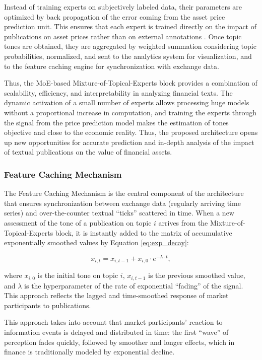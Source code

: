 Instead of training experts on subjectively labeled data, their parameters are optimized by back propagation of the error
coming from the asset price prediction unit. This ensures that each expert is trained directly on the impact of publications
on asset prices rather than on external annotations \parencite{shazeer2017outrageously}. Once topic tones are obtained,
they are aggregated by weighted summation considering topic probabilities, normalized, and sent to the analytics system
for visualization, and to the feature caching engine for synchronization with exchange data.

Thus, the MoE-based Mixture-of-Topical-Experts block provides a combination of scalability, efficiency, and interpretability
in analyzing financial texts. The dynamic activation of a small number of experts allows processing huge models without
a proportional increase in computation, and training the experts through the signal from the price prediction model makes
the estimation of tones objective and close to the economic reality. Thus, the proposed architecture opens up new opportunities
for accurate prediction and in-depth analysis of the impact of textual publications on the value of financial assets.

\subsubsection{Feature Caching Mechanism}
The Feature Caching Mechanism is the central component of the architecture that ensures synchronization
between exchange data (regularly arriving time series) and over-the-counter textual “ticks” scattered
in time. When a new assessment of the tone of a publication on topic $i$ arrives from the Mixture-of-Topical-Experts
block, it is instantly added to the matrix of accumulative exponentially smoothed values by Equation \ref{eq:exp_decay}:

\begin{equation}\label{eq:exp_decay}
    x_{i,t}=x_{i, t-1} + x_{i, 0} \cdot e^{-\lambda \cdot t},
\end{equation}

where $x_{i, 0}$ is the initial tone on topic $i$, $x_{i,t-1}$ is the previous smoothed value, and $\lambda$
is the hyperparameter of the rate of exponential “fading” of the signal. This approach reflects the lagged
and time-smoothed response of market participants to publications.

This approach takes into account that market participants' reaction to information events is delayed
and distributed in time: the first “wave” of perception fades quickly, followed by smoother and longer
effects, which in finance is traditionally modeled by exponential decline.

